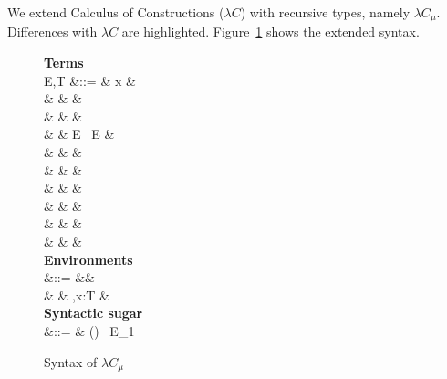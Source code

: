 We extend Calculus of Constructions ($\lambda C$) with recursive types, namely $\lambda C_{\mu}$. Differences with $\lambda C$ are highlighted. Figure~\ref{fig:musyn} shows the extended syntax.

\begin{figure}[H]
\small
\begin{syntax}
  \textbf{Terms} \\
  E,T &::= & x &  \\
    & \mid & \star &  \\
    & \mid & \square &  \\
    & \mid & E \ E &  \\
    & \mid &  &  \\
    & \mid &  &  \\
    & \mid &  &  \\
    & \mid &  &  \\
    & \mid &  &  \\
    & \mid &  &  \\
  \textbf{Environments} \\
  \Gamma &::= &\varnothing &  \\
         & \mid & \Gamma,x:T &  \\
  \textbf{Syntactic sugar} \\
   &::= & () \ E_{1}
\end{syntax}
\caption{Syntax of $\lambda C_\mu$}\label{fig:musyn}
\end{figure}

